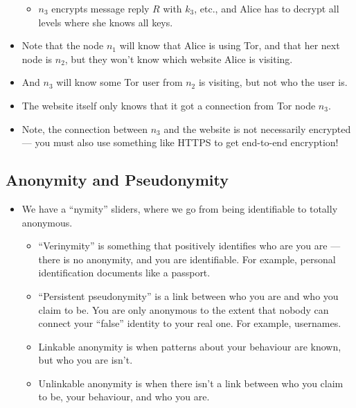 \documentclass{article}
\begin{document}
\begin{itemize}
\begin{itemize}
            \item $n_3$ encrypts message reply $R$ with $k_3$, etc., and Alice has to decrypt all levels where she knows all keys.
        \end{itemize}
    \item Note that the node $n_1$ will know that Alice is using Tor, and that her next node is $n_2$, but they won't know which website Alice is visiting.
    \item And $n_3$ will know some Tor user from $n_2$ is visiting, but not who the user is.
    \item The website itself only knows that it got a connection from Tor node $n_3$.
    \item Note, the connection between $n_3$ and the website is not necessarily encrypted --- you must also use something like HTTPS to get end-to-end encryption!
\end{itemize}

\subsection{Anonymity and Pseudonymity}
\begin{itemize}
    \item We have a ``nymity'' sliders, where we go from being identifiable to totally anonymous.
        \begin{itemize}
            \item ``Verinymity'' is something that positively identifies who are you are --- there is no anonymity, and you are identifiable.  For example, personal identification documents like a passport.
            \item ``Persistent pseudonymity'' is a link between who you are and who you claim to be.  You are only anonymous to the extent that nobody can connect your ``false'' identity to your real one.  For example, usernames.
            \item Linkable anonymity is when patterns about your behaviour are known, but who you are isn't.
            \item Unlinkable anonymity is when there isn't a link between who you claim to be, your behaviour, and who you are.
        \end{itemize}
\end{itemize}
\end{document}
